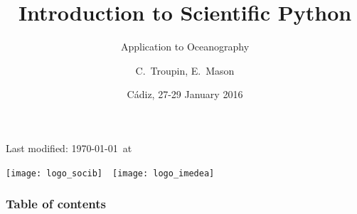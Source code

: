 
\parindent 0cm

\title[Scientific Python]{Introduction to Scientific Python}
\subtitle{Application to Oceanography}
\date[]{Cádiz, 27-29 January 2016}
\author{C.~Troupin, E.~Mason}



\begin{frame}
\centering

\footnotesize
\maketitle
{\scriptsize Last modified: \today\ at \currenttime}
\vfill



\texttt{[image: logo\_socib]}~~\texttt{[image: logo\_imedea]}


\end{frame}





\begin{frame}
\frametitle{Table of contents}
\end{frame}


% 
%
%

%
%
  


